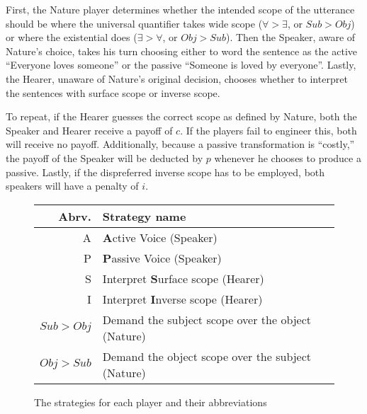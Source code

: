 \documentclass{article}
\begin{document}
First, the Nature player determines whether the intended scope of the utterance should be where the universal quantifier takes wide scope ($\forall>\exists$, or $Sub > Obj$) or where the existential does ($\exists>\forall$, or $Obj > Sub$).
Then the Speaker, aware of Nature's choice, takes his turn choosing either to word the sentence as the active ``Everyone loves someone'' or the passive ``Someone is loved by everyone''.
Lastly, the Hearer, unaware of Nature's original decision, chooses whether to interpret the sentences with surface scope or inverse scope.

To repeat, if the Hearer guesses the correct scope as defined by Nature, both the Speaker and Hearer receive a payoff of $c$.
If the players fail to engineer this, both will receive no payoff.
Additionally, because a passive transformation is ``costly,'' the payoff of the Speaker will be deducted by $p$ whenever he chooses to produce a passive.
Lastly, if the dispreferred inverse scope has to be employed, both speakers will have a penalty of $i$.

\begin{figure}
	\begin{tabular}{r||l}
		Abrv.& Strategy name\\\hline\hline
		A & \textbf{A}ctive Voice (Speaker)\\
		P & \textbf{P}assive Voice (Speaker)\\
		S & Interpret \textbf{S}urface scope (Hearer)\\
		I & Interpret \textbf{I}nverse scope (Hearer)\\
		$Sub > Obj$ & Demand the subject scope over the object (Nature)\\
		$Obj > Sub$ & Demand the object scope over the subject (Nature)\\
	\end{tabular}
	\caption{The strategies for each player and their abbreviations}
\end{figure}
\end{document}
